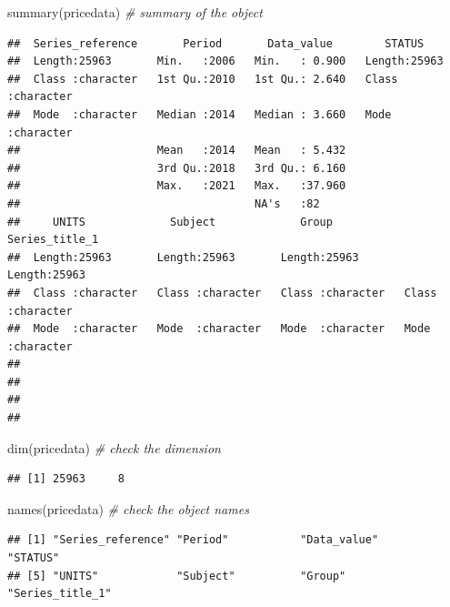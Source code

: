 \documentclass[
  landscape]{article}
\newenvironment{Shaded}{\begin{snugshade}}{\end{snugshade}}
\newcommand{\CommentTok}[1]{\textcolor[rgb]{0.56,0.35,0.01}{\textit{#1}}}
\newcommand{\FunctionTok}[1]{\textcolor[rgb]{0.00,0.00,0.00}{#1}}
\newcommand{\NormalTok}[1]{#1}
\begin{document}
\begin{Shaded}
\begin{Highlighting}[]
\FunctionTok{summary}\NormalTok{(pricedata) }\CommentTok{\# summary of the object}
\end{Highlighting}
\end{Shaded}

\begin{verbatim}
##  Series_reference       Period       Data_value        STATUS         
##  Length:25963       Min.   :2006   Min.   : 0.900   Length:25963      
##  Class :character   1st Qu.:2010   1st Qu.: 2.640   Class :character  
##  Mode  :character   Median :2014   Median : 3.660   Mode  :character  
##                     Mean   :2014   Mean   : 5.432                     
##                     3rd Qu.:2018   3rd Qu.: 6.160                     
##                     Max.   :2021   Max.   :37.960                     
##                                    NA's   :82                         
##     UNITS             Subject             Group           Series_title_1    
##  Length:25963       Length:25963       Length:25963       Length:25963      
##  Class :character   Class :character   Class :character   Class :character  
##  Mode  :character   Mode  :character   Mode  :character   Mode  :character  
##                                                                             
##                                                                             
##                                                                             
## 
\end{verbatim}

\begin{Shaded}
\begin{Highlighting}[]
\FunctionTok{dim}\NormalTok{(pricedata) }\CommentTok{\# check the dimension}
\end{Highlighting}
\end{Shaded}

\begin{verbatim}
## [1] 25963     8
\end{verbatim}

\begin{Shaded}
\begin{Highlighting}[]
\FunctionTok{names}\NormalTok{(pricedata) }\CommentTok{\# check the object names}
\end{Highlighting}
\end{Shaded}

\begin{verbatim}
## [1] "Series_reference" "Period"           "Data_value"       "STATUS"          
## [5] "UNITS"            "Subject"          "Group"            "Series_title_1"
\end{verbatim}
\end{document}
